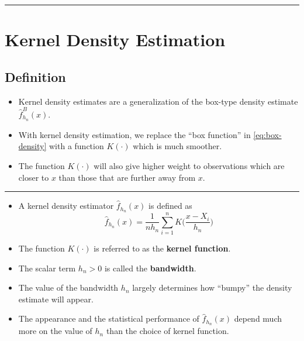 \documentclass[]{book}
\begin{document}
\begin{center}\rule{0.5\linewidth}{\linethickness}\end{center}

\hypertarget{kernel-density-estimation}{%
\section{Kernel Density Estimation}\label{kernel-density-estimation}}

\hypertarget{definition-6}{%
\subsection{Definition}\label{definition-6}}

\begin{itemize}
\item
  Kernel density estimates are a generalization of the box-type density estimate \(\hat{f}_{h_{n}}^{B}(x)\).
\item
  With kernel density estimation, we replace the ``box function'' in \eqref{eq:box-density}
  with a function \(K(\cdot)\) which is much smoother.
\item
  The function \(K(\cdot)\) will also give higher weight to observations which are closer to \(x\)
  than those that are further away from \(x\).
\end{itemize}

\begin{center}\rule{0.5\linewidth}{\linethickness}\end{center}

\begin{itemize}
\item
  A kernel density estimator \(\hat{f}_{h_{n}}(x)\) is defined as
  \begin{equation}
  \hat{f}_{h_{n}}(x) = \frac{1}{nh_{n}} \sum_{i=1}^{n} K\Big( \frac{x - X_{i}}{h_{n}} \Big) 
  \label{eq:kernel-density-formula}
  \end{equation}
\item
  The function \(K( \cdot )\) is referred to as the \textbf{kernel function}.
\item
  The scalar term \(h_{n} > 0\) is called the \textbf{bandwidth}.
\item
  The value of the bandwidth \(h_{n}\) largely determines how ``bumpy'' the density estimate
  will appear.
\item
  The appearance and the statistical performance of \(\hat{f}_{h_{n}}(x)\) depend much more on the value of \(h_{n}\) than
  the choice of kernel function.
\end{itemize}
\end{document}
